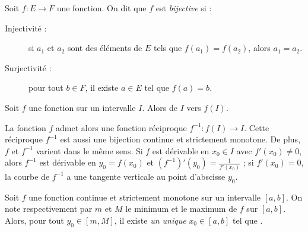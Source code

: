       \begin{defi}[Bijective]
            Soit $f : E \rightarrow F$ une fonction.
            On dit que $f$ est \emph{bijective} si : 
                  \begin{description}
                        \item[Injectivit\'e :] 
                                               si $a_1$ et $a_2$ sont des \'el\'ements de $E$ tels que 
                                               $f(a_1) = f(a_2)$, alors $a_1=a_2$.
                        \item[Surjectivit\'e :]
                                               pour tout $b\in F$, il existe $a\in E$ tel que $f(a)=b$.
                  \end{description}
      \end{defi}
      
      \begin{prop}
            Soit $f$ une fonction  sur un intervalle $I$. \linebreak
            Alors  de $I$ vers $f(I)$.
            
            La fonction $f$ admet alors une fonction r\'eciproque $f^{-1} : f(I) \rightarrow I$.
            Cette r\'eciproque $f^{-1}$ est aussi une bijection continue et strictement monotone.
            De plus, $f$ et $f^{-1}$ varient dans le m\^eme sens.
            Si $f$ est d\'erivable en $x_0 \in I$ avec $f'(x_0) \neq 0$, alors $f^{-1}$ est d\'erivable en $y_0 = f(x_0)$ et
            $\left(f^{-1}\right)'(y_0) = \frac{1}{f'(x_0)}$ ; si $f'(x_0) = 0$, la courbe de $f^{-1}$ a une tangente verticale au point d'abscisse $y_0$.
      \end{prop}

      \begin{cor}
            Soit $f$ une fonction continue et strictement monotone sur un intervalle $[a,b]$.
            On note respectivement par $m$ et $M$ le minimum et le maximum de $f$ sur $[a,b]$.
            Alors, pour tout $y_0\in[m,M]$, il existe \emph{un unique} $x_0\in[a,b]$ tel que .
      \end{cor}

